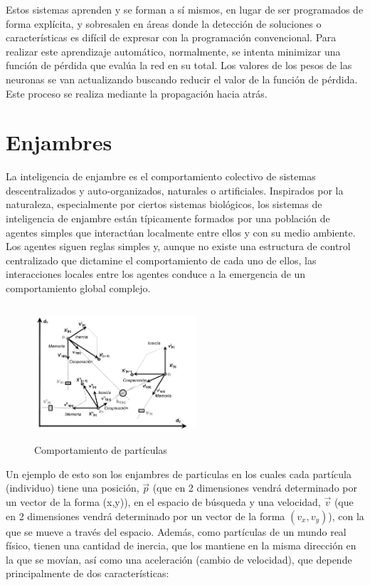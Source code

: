 \documentclass[12pt, titlepage]{article}
\begin{document}
Estos sistemas aprenden y se forman a sí mismos, en lugar de ser programados de forma explícita, y sobresalen en áreas donde la detección de soluciones o características es difícil de expresar con la programación convencional. Para realizar este aprendizaje automático, normalmente, se intenta minimizar una función de pérdida que evalúa la red en su total. Los valores de los pesos de las neuronas se van actualizando buscando reducir el valor de la función de pérdida. Este proceso se realiza mediante la propagación hacia atrás. 
\section{Enjambres}
La inteligencia de enjambre es el comportamiento colectivo de sistemas descentralizados y auto-organizados, naturales o artificiales. Inspirados por la naturaleza, especialmente por ciertos sistemas biológicos, los sistemas de inteligencia de enjambre están típicamente formados por una población de agentes simples que interactúan localmente entre ellos y con su medio ambiente. Los agentes siguen reglas simples y, aunque no existe una estructura de control centralizado que dictamine el comportamiento de cada uno de ellos, las interacciones locales entre los agentes conduce a la emergencia de un comportamiento global complejo.
\begin{figure}[H]
    \begin{center}
        \includegraphics[width=6cm, height=5cm]{./img/particula.png}
        \caption{Comportamiento de partículas}
        \label{fig:particula}
    \end{center}
\end{figure}
Un ejemplo de esto son los enjambres de particulas en los cuales cada partícula (individuo) tiene una posición, $\overrightarrow{p}$ (que en 2 dimensiones vendrá determinado por un vector de la forma (x,y)), en el espacio de búsqueda y una velocidad, $\overrightarrow{v}$ (que en 2 dimensiones vendrá determinado por un vector de la forma $(v_x,v_y)$), con la que se mueve a través del espacio. Además, como partículas de un mundo real físico, tienen una cantidad de inercia, que los mantiene en la misma dirección en la que se movían, así como una aceleración (cambio de velocidad), que depende principalmente de dos características:
\end{document}

